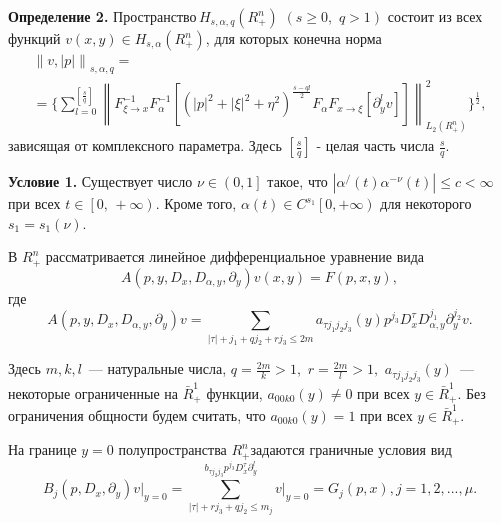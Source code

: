 \textbf{Определение 2.} Пространство$\,H_{s,\alpha ,q} (R_ + ^n )\,\,(s
\ge 0,\,\,q > 1)$ состоит из всех функций $v(x,y) \in H_{s,\alpha } (R_ + ^n
)$, для которых конечна норма
\begin{multline*}
\left\| {v,\left| p \right|} \right\|_{s,\alpha ,q} =
\\=
\{\sum\limits_{l =
0}^{[\frac{s}{q}]} {\left\| {F_{\xi \to x}^{ - 1} F_\alpha ^{ - 1} [(\left|
p \right|^2 + \left| \xi \right|^2 + \eta ^2)^{\frac{s - ql}{2}}F_\alpha
F_{x \to \xi } [\partial _y^l v]]} \right\|_{L_2 (R_ + ^n )}^2 }
\}^{\frac{1}{2}},
\end{multline*}
зависящая от комплексного параметра. Здесь $[\frac{s}{q}]$ - целая часть
числа $\frac{s}{q}.$

\textbf{Условие 1.} Существует число $\nu \in \left( {0,1} \right]$ такое,
что
\linebreak
$\left| {\alpha ^ / (t)\alpha ^{ - \nu }(t)} \right| \le c < \infty $
при всех $t \in \left[ {0,\, + \infty } \right)$. Кроме того, $\alpha \left(
t \right) \in C^{s_1 }\left[ {0, + \infty } \right)$ для некоторого $s_1 =
s_1 (\nu )$.

В $R_ + ^n $ рассматривается линейное дифференциальное уравнение вида
\begin{equation}
\label{eq4600}
A(p,y,D_x ,D_{\alpha ,y} ,\partial _y )v(x,y) = F(p,x,y),
\end{equation}
где
\begin{equation}
\label{eq4601}
A(p,y,D_x ,D_{\alpha ,y} ,\partial _y )v = \sum\limits_{\left| \tau \right|
+ j_1 + qj_2 + rj_3 \le 2m} {a_{\tau j_1 j_2 j_3 } (y)p^{j_3 }D_x^\tau
D_{\alpha ,y}^{j_1 } } \partial _y^{j_2 } v.
\end{equation}



Здесь $m,k,l$~--- натуральные числа, $q = \frac{2m}{k} > 1,\,\,r = \frac{2m}{l} >
1,\,\,a_{\tau j_1 j_2 j_3 } (y)$~--- некоторые ограниченные на $\bar {R}_ + ^1
$ функции,
\linebreak
$a_{00k0} (y) \ne 0$ при всех $y \in \bar {R}_ + ^1 .$ Без
ограничения общности будем считать, что $a_{00k0} (y) = 1$ при всех $y \in
\bar {R}_ + ^1 .$

На границе $y = 0$ полупространства $R_ + ^n $задаются граничные условия вид
\begin{equation}
\label{eq4602}
B_j (p,D_x ,\partial _y )\left. v \right|_{y = 0} = \sum\limits_{\left| \tau
\right| + rj_3 + qj_2 \le m_j }^ {b_{\tau j_2 j_3 } p^{j_3 }D_x^\tau
\partial _y^l } \left. v \right|_{y = 0} = G_j (p,x),
j = 1,2,...,\mu .
\end{equation}



